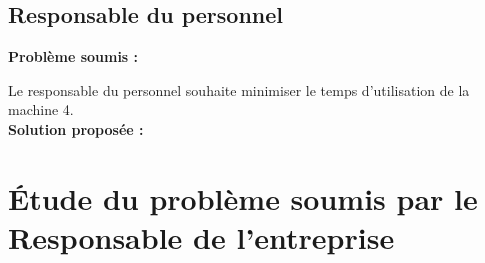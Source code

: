 \documentclass[paper=a4, fontsize=11pt]{scrartcl}
\numberwithin{equation}{section}		%
\numberwithin{figure}{section}			%
\numberwithin{table}{section}				%
\renewcommand{\bf}[1]{\textbf{#1}}
\begin{document}
\subsection{Responsable du personnel}
\bf{Problème soumis :}

Le responsable du personnel souhaite minimiser le temps d'utilisation de la machine 4.\\

\bf{Solution proposée :}

\section{\'Etude du problème soumis par le Responsable de l'entreprise}

\end{document}
